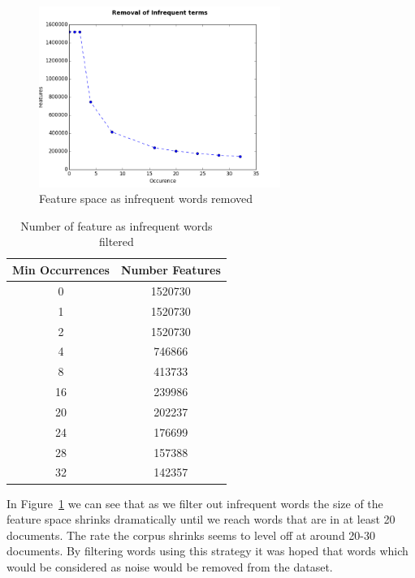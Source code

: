 \begin{figure}[h]
    \centering
        \includegraphics[width=0.7\textwidth]{Figures/CorpusFilterInfrequent.png}
    \caption{Feature space as infrequent words removed}
    \label{fig:FilterInfrequent}
\end{figure}

\begin{table}[h]
    \centering
    \begin{tabular}{|c c|}
         \hline
         Min Occurrences & Number Features \\ [0.5ex]
         \hline\hline
         0 & 1520730 \\
         1 & 1520730 \\
         2 & 1520730 \\
         4 & 746866 \\
         8 & 413733 \\
         16 & 239986 \\
         20 & 202237 \\
         24 & 176699 \\
         28 & 157388 \\
         32 & 142357 \\ [1ex]
         \hline
    \end{tabular}
    \caption{Number of feature as infrequent words filtered}
    \label{table:infrequentFeatures}
\end{table}

In Figure~\ref{fig:FilterInfrequent} we can see that as we filter out infrequent words the size of the feature space shrinks dramatically until we reach words that are in at least 20 documents.
The rate the corpus shrinks seems to level off at around 20-30 documents.
By filtering words using this strategy it was hoped that words which would be considered as noise would be removed from the dataset.

